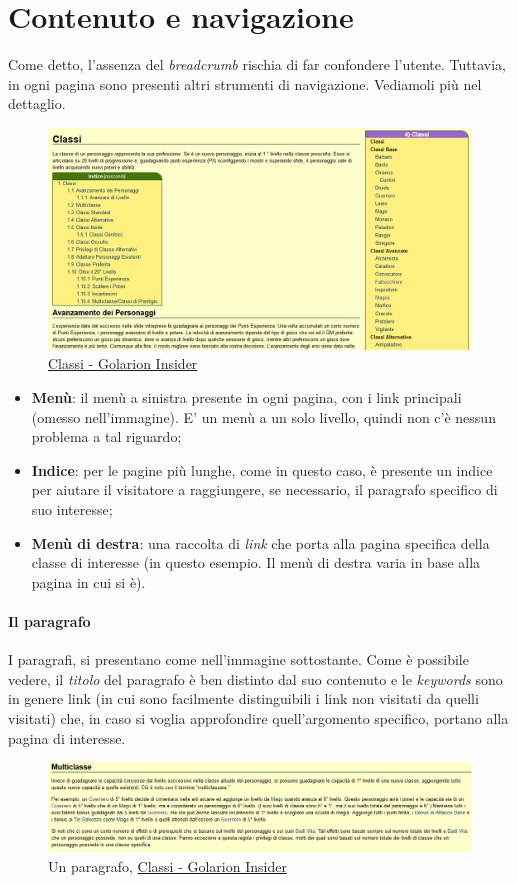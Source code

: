 \section{Contenuto e navigazione}

Come detto, l'assenza del \emph{breadcrumb} rischia di far confondere l'utente.
Tuttavia, in ogni pagina sono presenti altri strumenti di navigazione. Vediamoli più nel 
dettaglio.

\begin{figure}[hbt]
	\includegraphics[width=\textwidth]{img/classi.png}
	\caption{\href{http://golarion.altervista.org/wiki/Classi}{Classi - Golarion Insider}}
\end{figure}

\begin{itemize}
	\item \textbf{Menù}: il menù a sinistra presente in ogni pagina, con i link principali (omesso nell'immagine). E' un menù a un solo livello, quindi non c'è nessun problema a tal riguardo;
	\item \textbf{Indice}: per le pagine più lunghe, come in questo caso, è presente un indice per 
	aiutare il visitatore a raggiungere, se necessario, il paragrafo specifico di suo interesse;
	\item \textbf{Menù di destra}: una raccolta di \emph{link} che porta alla pagina specifica della
	classe di interesse (in questo esempio. Il menù di destra varia in base alla pagina in cui si è).
\end{itemize}

\clearpage

\paragraph{Il paragrafo} I paragrafi, si presentano come nell'immagine sottostante. Come è possibile
vedere, il \emph{titolo} del paragrafo è ben distinto dal suo contenuto e le \emph{keywords} sono in genere link (in cui sono facilmente distinguibili i link non visitati da quelli visitati) che, in caso si voglia approfondire quell'argomento specifico, portano alla pagina di interesse.

\begin{figure}[hbt]
	\includegraphics[width=\textwidth]{img/paragrafo.png}
	\caption{Un paragrafo, \href{http://golarion.altervista.org/wiki/Classi}{Classi - Golarion Insider}}
\end{figure}

